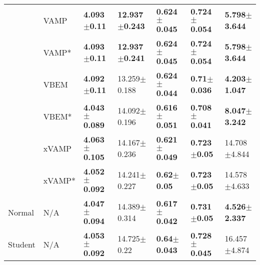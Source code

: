 \begin{tabular}{lllllll}
        & VAMP &   \textbf{4.093$\pm$0.11} &  \textbf{12.937$\pm$0.243} &  \textbf{0.624$\pm$0.045} &  \textbf{0.724$\pm$0.054} &  \textbf{5.798$\pm$3.644} \\
        & VAMP* &   \textbf{4.093$\pm$0.11} &  \textbf{12.937$\pm$0.241} &  \textbf{0.624$\pm$0.045} &  \textbf{0.724$\pm$0.054} &  \textbf{5.798$\pm$3.644} \\
        & VBEM &   \textbf{4.092$\pm$0.11} &           13.259$\pm$0.188 &  \textbf{0.624$\pm$0.044} &   \textbf{0.71$\pm$0.036} &  \textbf{4.203$\pm$1.047} \\
        & VBEM* &  \textbf{4.043$\pm$0.089} &           14.092$\pm$0.196 &  \textbf{0.616$\pm$0.051} &  \textbf{0.708$\pm$0.041} &  \textbf{8.047$\pm$3.242} \\
        & xVAMP &  \textbf{4.063$\pm$0.105} &           14.167$\pm$0.236 &  \textbf{0.621$\pm$0.049} &   \textbf{0.723$\pm$0.05} &          14.708$\pm$4.844 \\
        & xVAMP* &  \textbf{4.052$\pm$0.092} &           14.241$\pm$0.227 &    \textbf{0.62$\pm$0.05} &   \textbf{0.723$\pm$0.05} &          14.578$\pm$4.633 \\
Normal & N/A &  \textbf{4.047$\pm$0.094} &           14.389$\pm$0.314 &  \textbf{0.617$\pm$0.042} &   \textbf{0.731$\pm$0.05} &  \textbf{4.526$\pm$2.337} \\
Student & N/A &  \textbf{4.053$\pm$0.092} &            14.725$\pm$0.22 &   \textbf{0.64$\pm$0.043} &  \textbf{0.728$\pm$0.045} &          16.457$\pm$4.874 \\
\bottomrule
\end{tabular}

